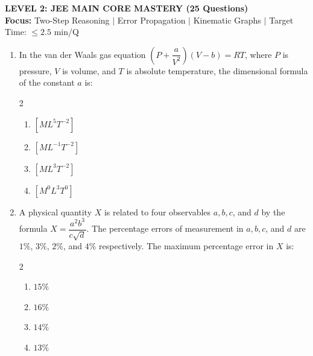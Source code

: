 \documentclass[11pt,a4paper]{article}
\begin{document}
\newpage

\begin{tcolorbox}[l2banner]
  {\Large \textbf{\textsf{LEVEL 2: JEE MAIN CORE MASTERY (25 Questions)}}}\\[2pt]
  {\footnotesize \textbf{Focus:} Two-Step Reasoning $\vert$ Error Propagation $\vert$ Kinematic Graphs $\vert$ Target Time: $\le 2.5$ min/Q}
\end{tcolorbox}
\vspace{6pt}

\begin{enumerate}[label=\textbf{\textcolor{l2Amber}{Q\arabic*.}},leftmargin=24pt,itemsep=10pt,start=26]

  \item In the van der Waals gas equation $\left(P + \dfrac{a}{V^2}\right)(V - b) = RT$, where $P$ is pressure, $V$ is volume, and $T$ is absolute temperature, the dimensional formula of the constant $a$ is:
  \begin{multicols}{2}
  \begin{enumerate}[label=\textbf{\textcolor{primaryDark}{(\Alph*)}},itemsep=2pt]
    \item $[M L^5 T^{-2}]$
    \item $[M L^{-1} T^{-2}]$
    \item $[M L^3 T^{-2}]$
    \item $[M^0 L^3 T^0]$
  \end{enumerate}
  \end{multicols}

  \item A physical quantity $X$ is related to four observables $a, b, c$, and $d$ by the formula $X = \dfrac{a^2 b^3}{c \sqrt{d}}$. The percentage errors of measurement in $a, b, c$, and $d$ are $1\%$, $3\%$, $2\%$, and $4\%$ respectively. The maximum percentage error in $X$ is:
  \begin{multicols}{2}
  \begin{enumerate}[label=\textbf{\textcolor{primaryDark}{(\Alph*)}},itemsep=2pt]
    \item $15\%$
    \item $16\%$
    \item $14\%$
    \item $13\%$
  \end{enumerate}
  \end{multicols}


\end{enumerate}
\end{document}
